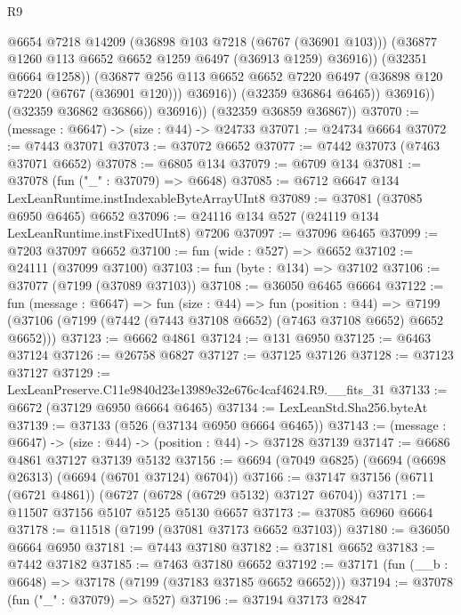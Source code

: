 \begin{lexlean}{R9}
\begin{coremodule}
                        @6654
                        @7218
                        @14209
                        (@36898 @103 @7218 (@6767 (@36901 @103)))
                        (@36877 @1260 @113 @6652 @6652 @1259 @6497 (@36913 @1259) @36916))
                      (@32351 @6664 @1258))
                    (@36877
                      @256
                      @113
                      @6652
                      @6652
                      @7220
                      @6497
                      (@36898 @120 @7220 (@6767 (@36901 @120)))
                      @36916))
                  (@32359 @36864 @6465))
                @36916))
            (@32359 @36862 @36866))
          @36916))
      (@32359 @36859 @36867))
@37070 := (message : @6647) -> (size : @44) -> @24733
@37071 := @24734 @6664
@37072 := @7443 @37071
@37073 := @37072 @6652
@37077 := @7442 @37073 (@7463 @37071 @6652)
@37078 := @6805 @134
@37079 := @6709 @134
@37081 := @37078 (fun ("_" : @37079) => @6648)
@37085 := @6712 @6647 @134 LexLeanRuntime.instIndexableByteArrayUInt8
@37089 := @37081 (@37085 @6950 @6465) @6652
@37096 := @24116 @134 @527 (@24119 @134 LexLeanRuntime.instFixedUInt8) @7206
@37097 := @37096 @6465
@37099 := @7203 @37097 @6652
@37100 := fun (wide : @527) => @6652
@37102 := @24111 (@37099 @37100)
@37103 := fun (byte : @134) => @37102
@37106 := @37077 (@7199 (@37089 @37103))
@37108 := @36050 @6465 @6664
@37122 := fun (message : @6647) =>
  fun (size : @44) =>
  fun (position : @44) =>
  @7199 (@37106 (@7199 (@7442 (@7443 @37108 @6652) (@7463 @37108 @6652) @6652 @6652)))
@37123 := @6662 @4861
@37124 := @131 @6950
@37125 := @6463 @37124
@37126 := @26758 @6827
@37127 := @37125 @37126
@37128 := @37123 @37127
@37129 := LexLeanPreserve.C11e9840d23e13989e32e676c4caf4624.R9.__fits_31
@37133 := @6672 (@37129 @6950 @6664 @6465)
@37134 := LexLeanStd.Sha256.byteAt
@37139 := @37133 (@526 (@37134 @6950 @6664 @6465))
@37143 := (message : @6647) -> (size : @44) -> (position : @44) -> @37128 @37139
@37147 := @6686 @4861 @37127 @37139 @5132
@37156 := @6694 (@7049 @6825) (@6694 (@6698 @26313) (@6694 (@6701 @37124) @6704))
@37166 := @37147 @37156 (@6711 (@6721 @4861)) (@6727 (@6728 (@6729 @5132) @37127 @6704))
@37171 := @11507 @37156 @5107 @5125 @5130 @6657
@37173 := @37085 @6960 @6664
@37178 := @11518 (@7199 (@37081 @37173 @6652 @37103))
@37180 := @36050 @6664 @6950
@37181 := @7443 @37180
@37182 := @37181 @6652
@37183 := @7442 @37182
@37185 := @7463 @37180 @6652
@37192 := @37171 (fun (__b : @6648) => @37178 (@7199 (@37183 @37185 @6652 @6652)))
@37194 := @37078 (fun ("_" : @37079) => @527)
@37196 := @37194 @37173 @2847

\end{coremodule}
\end{lexlean}
